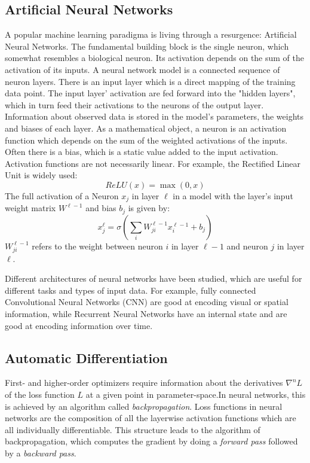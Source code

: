 \documentclass[twoside,12pt,a4paper]{report}
\begin{document}
\subsection{Artificial Neural Networks}
A popular machine learning paradigma is living through a resurgence: Artificial Neural Networks. The fundamental building block is the single neuron, which somewhat resembles a biological neuron. Its activation depends on the sum of the activation of its inputs. A neural network model is a connected sequence of neuron layers. There is an input layer which is a direct mapping of the training data point. The input layer' activation are fed forward into the "hidden layers", which in turn feed their activations to the neurons of the output layer. Information about observed data is stored in the model's parameters, the weights and biases of each layer.
As a mathematical object, a neuron is an activation function which depends on the sum of the weighted activations of the inputs. Often there is a bias, which is a static value added to the input activation. Activation functions are not necessarily linear.
For example, the Rectified Linear Unit is widely used:
$$ReLU(x) = \max(0,x) $$
The full activation of a Neuron $x_j$ in layer $\ell$ in a model with the layer's input weight matrix $W^{\ell -1}$ and bias $b_j$ is given by:
$$x_j^{\ell}=\sigma \left( \sum\limits_i W^{\ell -1}_{ji}x_i^{\ell-1} + b_j\right)$$
$W^{\ell -1}_{ji}$ refers to the weight between neuron $i$ in layer $\ell -1$ and neuron $j$ in layer $\ell$.

Different architectures of neural networks have been studied, which are useful for different tasks and types of input data. For example, fully connected Convolutional Neural Networks (CNN) are good at encoding visual or spatial information, while Recurrent Neural Networks have an internal state and are good at encoding information over time.



\subsection{Automatic Differentiation}
First- and higher-order optimizers require information about the derivatives $\nabla ^n L$ of the loss function $L$ at a given point in parameter-space.In neural networks, this is achieved by an algorithm called \textit{backpropagation}.
Loss functions in neural networks are the composition of all the layerwise activation functions which are all individually differentiable. This structure leads to the algorithm of backpropagation, which computes the gradient by doing a \textit{forward pass} followed by a \textit{backward pass}.
\end{document}
